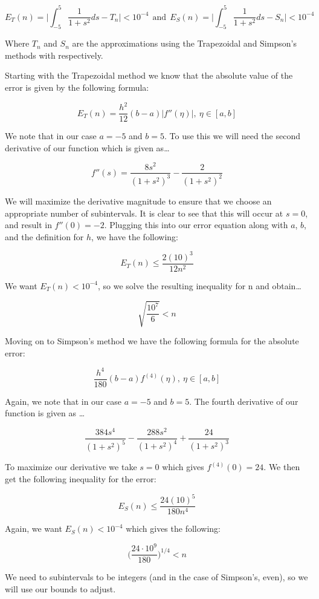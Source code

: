 \documentclass[11pt]{article}
\begin{document}
\[
E_T(n)=\Big| \int_{-5}^5\frac{1}{1+s^2}ds - T_n \Big| < 10^{-4} \:\:\text{and}\:\: E_S(n)=\Big| \int_{-5}^5\frac{1}{1+s^2}ds - S_n \Big| < 10^{-4}
\]

Where \(T_n\) and \(S_n\) are the approximations using the Trapezoidal
and Simpson's methods with respectively.

    Starting with the Trapezoidal method we know that the absolute value of
the error is given by the following formula:

\[ E_T(n) = \frac{h^2}{12}(b-a)|f''(\eta)|,\:\eta\in[a,b] \]

We note that in our case \(a=-5\) and \(b=5\). To use this we will need
the second derivative of our function which is given as\ldots{}

\[ f''(s) = \frac{8s^2}{(1+s^2)^3} - \frac{2}{(1+s^2)^2} \]

    We will maximize the derivative magnitude to ensure that we choose an
appropriate number of subintervals. It is clear to see that this will
occur at \(s=0\), and result in \(f''(0)=-2\). Plugging this into our
error equation along with \(a\), \(b\), and the definition for \(h\), we
have the following:

\[ E_T(n) \leq \frac{2(10)^3}{12n^2} \]

We want \(E_T(n) < 10^{-4}\), so we solve the resulting inequality for n
and obtain\ldots{}

\[ \sqrt{\frac{10^7}{6}} < n \]

    Moving on to Simpson's method we have the following formula for the
absolute error:

\[ \frac{h^4}{180}(b-a)f^{(4)}(\eta),\:\eta\in[a,b] \]

Again, we note that in our case \(a=-5\) and \(b=5\). The fourth
derivative of our function is given as \ldots{}

\[ \frac{384s^4}{(1 + s^2)^5} - \frac{288s^2}{(1 + s^2)^4} + \frac{24}{(1 + s^2)^3} \]

    To maximize our derivative we take \(s=0\) which gives
\(f^{(4)}(0)=24\). We then get the following inequality for the error:

\[ E_S(n) \leq \frac{24(10)^5}{180n^4} \]

Again, we want \(E_S(n)<10^{-4}\) which gives the following:

\[ \Big(\frac{24\cdot10^9}{180}\Big)^{1/4} < n \]

    We need to subintervals to be integers (and in the case of Simpson's,
even), so we will use our bounds to adjust.
\end{document}
